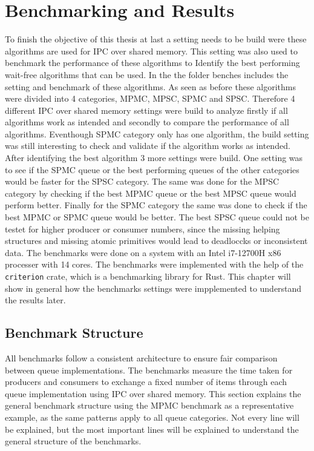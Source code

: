 \chapter{Benchmarking and Results}\label{ch:results}
To finish the objective of this thesis at last a setting needs to be build were these algorithms are used for \ac{IPC} over shared memory. This setting was also used to benchmark the performance of these algorithms to Identify the best performing wait-free algorithms that can be used. In the \cite{githubMA} the folder benches includes the setting and benchmark of these algorithms. As seen as before these algorithms were divided into 4 categories, \ac{MPMC}, \ac{MPSC}, \ac{SPMC} and \ac{SPSC}. Therefore 4 different \ac{IPC} over shared memory settings were build to analyze firstly if all algorithms work as intended and secondly to compare the performance of all algorithms. Eventhough \ac{SPMC} category only has one algorithm, the build setting was still interesting to check and validate if the algorithm works as intended. After identifying the best algorithm 3 more settings were build. One setting was to see if the \ac{SPMC} queue or the best performing queues of the other categories would be faster for the \ac{SPSC} category. The same was done for the \ac{MPSC} category by checking if the best \ac{MPMC} queue or the best \ac{MPSC} queue would perform better. Finally for the \ac{SPMC} category the same was done to check if the best \ac{MPMC} or  \ac{SPMC} queue would be better. The best \ac{SPSC} queue could not be testet for higher producer or consumer numbers, since the missing helping structures and missing atomic primitives would lead to deadloccks or inconsistent data. The benchmarks were done on a system with an Intel i7-12700H x86 processer with 14 cores. The benchmarks were implemented with the help of the \texttt{criterion} crate, which is a benchmarking library for Rust. This chapter will show in general how the benchmarks settings were impplemented to understand the results later.

\section{Benchmark Structure}
All benchmarks follow a consistent architecture to ensure fair comparison between queue implementations. The benchmarks measure the time taken for producers and consumers to exchange a fixed number of items through each queue implementation using \ac{IPC} over shared memory. This section explains the general benchmark structure using the \ac{MPMC} benchmark as a representative example, as the same patterns apply to all queue categories. Not every line will be explained, but the most important lines will be explained to understand the general structure of the benchmarks. 

